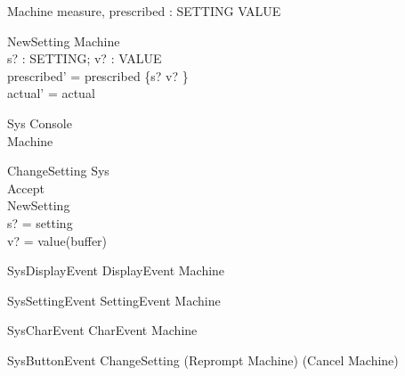\documentclass{llncs}
\begin{document}
\begin{schema}{Machine}
measure, prescribed : SETTING \fun VALUE
\end{schema}
\begin{schema}{NewSetting}
\Delta Machine \\
s? : SETTING; v? : VALUE \\
\ST prescribed' = prescribed \oplus \{s? \mapsto v? \}\\
actual' = actual
\end{schema}
\begin{schema}{Sys}
Console \\
Machine
\end{schema}
\begin{schema}{ChangeSetting}
\Delta Sys \\
Accept \\
NewSetting \\
\ST s? = setting \\
v? = value(buffer)
\end{schema}
\begin{zed}
SysDisplayEvent \sdef DisplayEvent \land \Xi Machine
\end{zed}
\begin{zed}
SysSettingEvent \sdef SettingEvent \land \Xi Machine
\end{zed}
\begin{zed}
SysCharEvent \sdef CharEvent \land \Xi Machine
\end{zed}
\begin{zed}
SysButtonEvent \sdef ChangeSetting \lor (Reprompt \land \Xi
Machine) \lor (Cancel \land \Xi Machine)
\end{zed}
\end{document}

